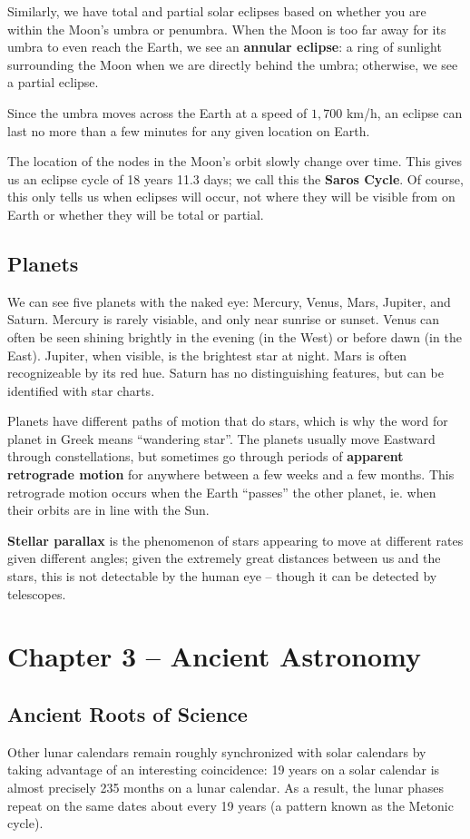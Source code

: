 \documentclass[12pt]{article}
\begin{document}
Similarly, we have total and partial solar eclipses based on whether you are within the Moon's umbra or penumbra. When the Moon is too far away for its umbra to even reach the Earth, we see an {\bf annular eclipse}: a ring of sunlight surrounding the Moon when we are directly behind the umbra; otherwise, we see a partial eclipse.

Since the umbra moves across the Earth at a speed of $1,700$ km/h, an eclipse can last no more than a few minutes for any given location on Earth.

The location of the nodes in the Moon's orbit slowly change over time. This gives us an eclipse cycle of 18 years 11.3 days; we call this the {\bf Saros Cycle}. Of course, this only tells us when eclipses will occur, not where they will be visible from on Earth or whether they will be total or partial.

\subsection{Planets}
We can see five planets with the naked eye: Mercury, Venus, Mars, Jupiter, and Saturn. Mercury is rarely visiable, and only near sunrise or sunset. Venus can often be seen shining brightly in the evening (in the West) or before dawn (in the East). Jupiter, when visible, is the brightest star at night. Mars is often recognizeable by its red hue. Saturn has no distinguishing features, but can be identified with star charts.

Planets have different paths of motion that do stars, which is why the word for planet in Greek means ``wandering star''. The planets usually move Eastward through constellations, but sometimes go through periods of {\bf apparent retrograde motion} for anywhere between a few weeks and a few months. This retrograde motion occurs when the Earth ``passes'' the other planet, ie. when their orbits are in line with the Sun.

{\bf Stellar parallax} is the phenomenon of stars appearing to move at different rates given different angles; given the extremely great distances between us and the stars, this is not detectable by the human eye -- though it can be detected by telescopes.

\section{Chapter 3 -- Ancient Astronomy}
\subsection{Ancient Roots of Science}
Other lunar calendars remain roughly synchronized with solar calendars by taking advantage of an interesting coincidence: 19 years on a solar calendar is almost precisely 235 months on a lunar calendar. As a result, the lunar phases repeat on the same dates about every 19 years (a pattern known as the Metonic cycle).
\end{document}
